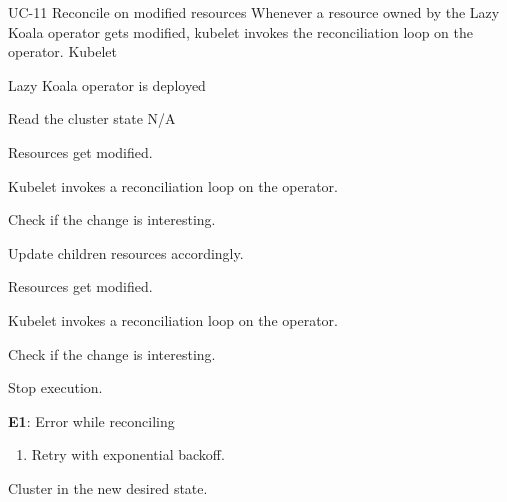 \vspace{-2em}
\UseCaseDescription
{UC-11}
{Reconcile on modified resources}
{Whenever a resource owned by the Lazy Koala operator gets modified, kubelet invokes the reconciliation loop on the operator.}
{Kubelet}
{\begin{CompactItemizes}
    \item Lazy Koala operator is deployed
\end{CompactItemizes}}
{Read the cluster state}
{N/A}
{\begin{CompactEnumerate}
    \item Resources get modified.
    \item Kubelet invokes a reconciliation loop on the operator.
    \item Check if the change is interesting.
    \item Update children resources accordingly.
\end{CompactEnumerate}}
{{\begin{CompactEnumerate}
    \item Resources get modified.
    \item Kubelet invokes a reconciliation loop on the operator.
    \item Check if the change is interesting.
    \item Stop execution.
\end{CompactEnumerate}}
{\textbf{E1}: Error while reconciling
\vspace{-4mm}\begin{enumerate}
    \item Retry with exponential backoff.
\vspace{-7mm}\end{enumerate}}
{\begin{CompactItemizes}
    \item Cluster in the new desired state.
\end{CompactItemizes}}}
